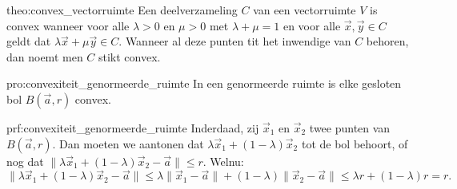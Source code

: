 \begin{theo}{theo:convex_vectorruimte}
    Een deelverzameling $C$ van een vectorruimte $V$ is convex wanneer voor alle $\lambda > 0$ en $\mu >0$ met $\lambda + \mu = 1$ en voor alle $\vec{x},\vec{y} \in C$ geldt dat $\lambda \vec{x} + \mu \vec{y} \in C$. Wanneer al deze punten tit het inwendige van $C$ behoren, dan noemt men $C$ stikt convex.
\end{theo}

\begin{pro}{pro:convexiteit_genormeerde_ruimte}
    In een genormeerde ruimte is elke gesloten bol $B(\vec{a},r)$ convex.
\end{pro}

\begin{prf}{prf:convexiteit_genormeerde_ruimte}
    Inderdaad, zij $\vec{x}_1$ en $\vec{x}_2$ twee punten van $B(\vec{a},r)$. Dan moeten we aantonen dat $\lambda\vec{x}_1 + (1-\lambda)\vec{x}_2$ tot de bol behoort, of nog dat $\|\lambda\vec{x}_1 + (1-\lambda)\vec{x}_2 -\vec{a}\| \leq r$. Welnu:
    \begin{equation*}
        \|\lambda\vec{x}_1 + (1-\lambda)\vec{x}_2 -\vec{a}\| \leq \lambda \|\vec{x}_1 - \vec{a}\| + (1 - \lambda)\|\vec{x}_2 - \vec{a}\| \leq \lambda r + (1-\lambda)r = r.
    \end{equation*}
    \vspace{-0.5cm}
\end{prf}